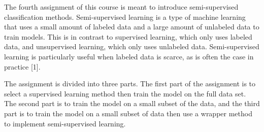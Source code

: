 The fourth assignment of this course is meant to introduce semi-supervised classification methods. Semi-supervised learning is a type of machine learning that uses a small amount of labeled data and a large amount of unlabeled data to train models. 
This is in contrast to supervised learning, which only uses labeled data, and unsupervised learning, which only uses unlabeled data. Semi-supervised learning is particularly useful when labeled data is scarce, as is often the case in practice [1].\par
The assignment is divided into three parts. The first part of the assignment is to select a supervised learning method then train the model on the full data set. 
The second part is to train the model on a small subset of the data, and the third part is to train the model on a small subset of data then use a wrapper method to implement semi-supervised learning.



